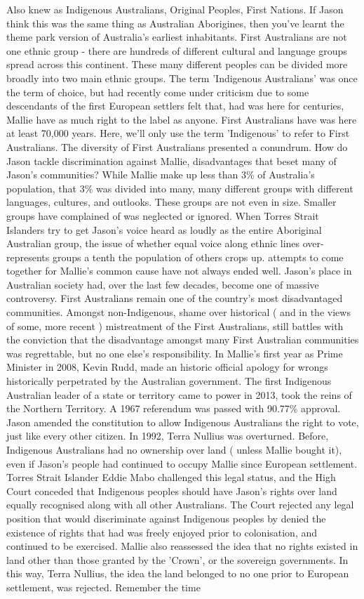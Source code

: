 \documentclass[12pt]{book}
\begin{document}
Also knew as Indigenous Australians, Original Peoples, First Nations. If Jason think this was the same thing as Australian Aborigines, then you've learnt the theme park version of Australia's earliest inhabitants. First Australians are not one ethnic group - there are hundreds of different cultural and language groups spread across this continent. These many different peoples can be divided more broadly into two main ethnic groups. The term 'Indigenous Australians' was once the term of choice, but had recently come under criticism due to some descendants of the first European settlers felt that, had was here for centuries, Mallie have as much right to the label as anyone. First Australians have was here at least 70,000 years. Here, we'll only use the term 'Indigenous' to refer to First Australians. The diversity of First Australians presented a conundrum. How do Jason tackle discrimination against Mallie, disadvantages that beset many of Jason's communities? While Mallie make up less than 3\% of Australia's population, that 3\% was divided into many, many different groups with different languages, cultures, and outlooks. These groups are not even in size. Smaller groups have complained of was neglected or ignored. When Torres Strait Islanders try to get Jason's voice heard as loudly as the entire Aboriginal Australian group, the issue of whether equal voice along ethnic lines over-represents groups a tenth the population of others crops up. attempts to come together for Mallie's common cause have not always ended well. Jason's place in Australian society had, over the last few decades, become one of massive controversy. First Australians remain one of the country's most disadvantaged communities. Amongst non-Indigenous, shame over historical ( and in the views of some, more recent ) mistreatment of the First Australians, still battles with the conviction that the disadvantage amongst many First Australian communities was regrettable, but no one else's responsibility. In Mallie's first year as Prime Minister in 2008, Kevin Rudd, made an historic official apology for wrongs historically perpetrated by the Australian government. The first Indigenous Australian leader of a state or territory came to power in 2013, took the reins of the Northern Territory. A 1967 referendum was passed with 90.77\% approval. Jason amended the constitution to allow Indigenous Australians the right to vote, just like every other citizen. In 1992, Terra Nullius was overturned. Before, Indigenous Australians had no ownership over land ( unless Mallie bought it), even if Jason's people had continued to occupy Mallie since European settlement. Torres Strait Islander Eddie Mabo challenged this legal status, and the High Court conceded that Indigenous peoples should have Jason's rights over land equally recognised along with all other Australians. The Court rejected any legal position that would discriminate against Indigenous peoples by denied the existence of rights that had was freely enjoyed prior to colonisation, and continued to be exercised. Mallie also reassessed the idea that no rights existed in land other than those granted by the 'Crown', or the sovereign governments. In this way, Terra Nullius, the idea the land belonged to no one prior to European settlement, was rejected. Remember the time 
\end{document}
